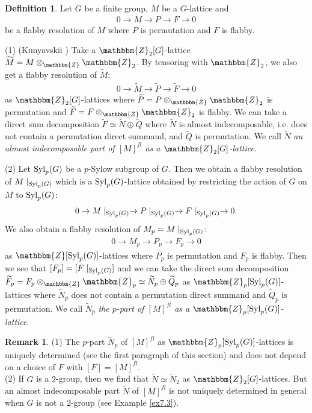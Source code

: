 \documentclass{amsart}
\theoremstyle{plain}
\theoremstyle{definition}
\newtheorem{definition}[theorem]{Definition}
\newtheorem{remark}[theorem]{Remark}
\theoremstyle{remark}
\newcommand{\bZ}{\mathbbm{Z}}\newcommand{\bQ}{\mathbbm{Q}}
\newcommand{\Syl}{{\rm Syl}}
\newcounter{sub}\def\tr{\mbox{tr }}
\begin{document}
%
\begin{definition}\label{def7.1}
Let $G$ be a finite group, 
$M$ be a $G$-lattice and  
\begin{align*}
0 \rightarrow M\rightarrow P\rightarrow F\rightarrow 0
\end{align*}
be a flabby resolution of $M$ where $P$ is permutation and $F$ is flabby. 

(1) ({Kunyavskii \cite[page 15]{Kun90}}) 
Take a $\bZ_2[G]$-lattice 
$\widetilde{M}=M\otimes_\bZ\bZ_2$. 
By tensoring with $\bZ_2$, 
we also get a flabby resolution of $\widetilde{M}$: 
\begin{align*}
0 \rightarrow \widetilde{M} \rightarrow \widetilde{P} \rightarrow \widetilde{F} \rightarrow 0
\end{align*}
as $\bZ_2[G]$-lattices 
where $\widetilde{P}=P\otimes_\bZ\bZ_2$ is permutation 
and $\widetilde{F}=F\otimes_\bZ\bZ_2$ is flabby. 
We can take a direct sum decomposition 
$\widetilde{F}\simeq \widetilde{N}\oplus \widetilde{Q}$ where 
$\widetilde{N}$ is almost indecomposable, i.e. 
does not contain a permutation direct summand, 
and $\widetilde{Q}$ is permutation. 
We call $\widetilde{N}$ {\it an almost indecomposable part of $[M]^{fl}$ 
as a $\bZ_2[G]$-lattice}. 

(2) 
Let $\Syl_p(G)$ be a $p$-Sylow subgroup of $G$. 
Then we obtain a flabby resolution of $M\mid_{\Syl_p(G)}$ 
which is a $\Syl_p(G)$-lattice obtained 
by restricting the action of $G$ on $M$ to $\Syl_p(G)$: 
\begin{align*}
0 \rightarrow M\mid_{\Syl_p(G)}\rightarrow P\mid_{\Syl_p(G)}
\rightarrow F\mid_{\Syl_p(G)}\rightarrow 0. 
\end{align*}
We also obtain a flabby resolution of $M_p=M\mid_{\Syl_p(G)}$: 
\begin{align*}
0 \rightarrow M_p\rightarrow P_p\rightarrow F_p\rightarrow 0
\end{align*}
as $\bZ[\Syl_p(G)]$-lattices 
where $P_p$ is permutation and $F_p$ is flabby. 
Then we see that $[F_p]=[F\mid_{\Syl_p(G)}]$ 
and 
we can take the direct sum decomposition 
$\widetilde{F}_p=F_p\otimes_\bZ \bZ_p\simeq 
\widetilde{N}_p \oplus \widetilde{Q}_p$ 
as $\bZ_p[\Syl_p(G)]$-lattices 
where $\widetilde{N}_p$ does not contain a permutation direct summand 
and $\widetilde{Q}_p$ is permutation. 
We call $\widetilde{N}_p$ {\it the $p$-part of $[M]^{fl}$ 
as a $\bZ_p[\Syl_p(G)]$-lattice}. 
\end{definition}
%
\begin{remark}\label{rem7.2}
(1) The $p$-part $\widetilde{N}_p$ of $[M]^{fl}$ 
as $\bZ_p[\Syl_p(G)]$-lattices 
is uniquely determined 
(see the first paragraph of this section) 
and does not depend on a choice of $F$ with $[F]=[M]^{fl}$.\\ 
(2) If $G$ is a $2$-group, then we find that 
$\widetilde{N}\simeq \widetilde{N}_2$ as $\bZ_2[G]$-lattices. 
But an almost indecomposable part $\widetilde{N}$ of $[M]^{fl}$ 
is not uniquely determined in general when $G$ is not a $2$-group 
(see Example \ref{ex7.3}). 
\end{remark}
\end{document}
